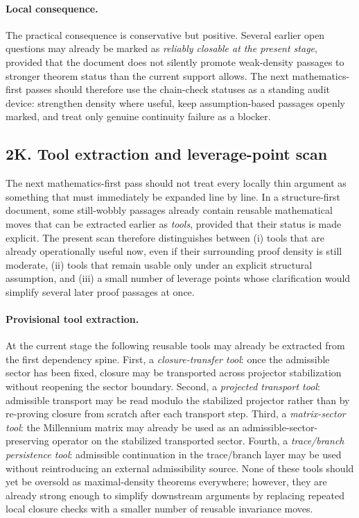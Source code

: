\paragraph{Local consequence.}
The practical consequence is conservative but positive. Several earlier open questions may already be marked as \emph{reliably closable at the present stage}, provided that the document does not silently promote weak-density passages to stronger theorem status than the current support allows. The next mathematics-first passes should therefore use the chain-check statuses as a standing audit device: strengthen density where useful, keep assumption-based passages openly marked, and treat only genuine continuity failure as a blocker.




\subsection*{2K. Tool extraction and leverage-point scan}
The next mathematics-first pass should not treat every locally thin argument as something that must immediately be expanded line by line. In a structure-first document, some still-wobbly passages already contain reusable mathematical moves that can be extracted earlier as \emph{tools}, provided that their status is made explicit. The present scan therefore distinguishes between (i) tools that are already operationally useful now, even if their surrounding proof density is still moderate, (ii) tools that remain usable only under an explicit structural assumption, and (iii) a small number of leverage points whose clarification would simplify several later proof passages at once.

\paragraph{Provisional tool extraction.}
At the current stage the following reusable tools may already be extracted from the first dependency spine. First, a \emph{closure-transfer tool}: once the admissible sector has been fixed, closure may be transported across projector stabilization without reopening the sector boundary. Second, a \emph{projected transport tool}: admissible transport may be read modulo the stabilized projector rather than by re-proving closure from scratch after each transport step. Third, a \emph{matrix-sector tool}: the Millennium matrix may already be used as an admissible-sector-preserving operator on the stabilized transported sector. Fourth, a \emph{trace/branch persistence tool}: admissible continuation in the trace/branch layer may be used without reintroducing an external admissibility source. None of these tools should yet be oversold as maximal-density theorems everywhere; however, they are already strong enough to simplify downstream arguments by replacing repeated local closure checks with a smaller number of reusable invariance moves.

